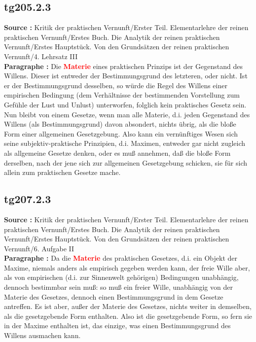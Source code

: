 \documentclass[a4paper,12pt,twoside]{book}
\newcommand{\match}[1]{\textcolor{red}{\textbf{#1}}}
\begin{document}
	\subsection*{tg205.2.3} 
	\textbf{Source : }Kritik der praktischen Vernunft/Erster Teil. Elementarlehre der reinen praktischen Vernunft/Erstes Buch. Die Analytik der reinen praktischen Vernunft/Erstes Hauptstück. Von den Grundsätzen der reinen praktischen Vernunft/4. Lehrsatz III\\  
	
	\noindent\textbf{Paragraphe : }Die \match{Materie} eines praktischen Prinzips ist der Gegenstand des Willens. Dieser ist entweder der Bestimmungsgrund des letzteren, oder nicht. Ist er der Bestimmungsgrund desselben, so würde die Regel des Willens einer empirischen Bedingung (dem Verhältnisse der bestimmenden Vorstellung zum Gefühle der Lust und Unlust) unterworfen, folglich kein praktisches Gesetz sein. Nun bleibt von einem  Gesetze, wenn man alle Materie, d.i. jeden Gegenstand des Willens (als Bestimmungsgrund) davon absondert, nichts übrig, als die bloße Form einer allgemeinen Gesetzgebung. Also kann ein vernünftiges Wesen sich seine subjektiv-praktische Prinzipien, d.i. Maximen, entweder gar nicht zugleich als allgemeine Gesetze denken, oder es muß annehmen, daß die bloße Form derselben, nach der jene sich zur allgemeinen Gesetzgebung schicken, sie für sich allein zum praktischen Gesetze mache. 
	
	\subsection*{tg207.2.3} 
	\textbf{Source : }Kritik der praktischen Vernunft/Erster Teil. Elementarlehre der reinen praktischen Vernunft/Erstes Buch. Die Analytik der reinen praktischen Vernunft/Erstes Hauptstück. Von den Grundsätzen der reinen praktischen Vernunft/6. Aufgabe II\\  
	
	\noindent\textbf{Paragraphe : }Da die \match{Materie} des praktischen Gesetzes, d.i. ein Objekt der Maxime, niemals anders als empirisch gegeben werden kann, der freie Wille aber, als von empirischen (d.i. zur Sinnenwelt gehörigen) Bedingungen unabhängig, dennoch bestimmbar sein muß: so muß ein freier Wille, unabhängig von der Materie des Gesetzes, dennoch einen Bestimmungsgrund in dem Gesetze antreffen. Es ist aber, außer der Materie des Gesetzes, nichts weiter in demselben, als die gesetzgebende Form enthalten. Also ist die gesetzgebende Form, so fern sie in der Maxime enthalten ist, das einzige, was einen Bestimmungsgrund des Willens ausmachen kann. 
	
\end{document}

